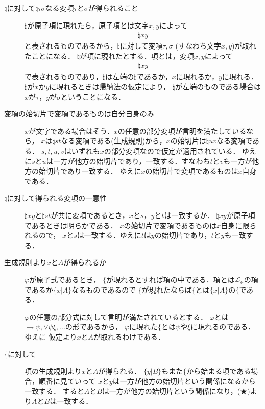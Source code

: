 	\begin{description}
		\item[$\natural$に対して$\natural \tau \sigma$なる変項$\tau$と$\sigma$が得られること]
			$\natural$が原子項に現れたら，原子項とは文字$x,y$によって
			\begin{align}
				\natural xy
			\end{align}
			と表されるものであるから，$\natural$に対して変項$\tau,\sigma$ (すなわち文字$x,y$)が取れたことになる．
			$\natural$が項に現れたとする．項とは，変項$x,y$によって
			\begin{align}
				\natural xy
			\end{align}
			で表されるものであり，$\natural$は左端の$\natural$であるか，$x$に現れるか，$y$に現れる．
			$\natural$が$x$か$y$に現れるときは帰納法の仮定により，
			$\natural$が左端のものである場合は$x$が$\tau$，$y$が$\sigma$ということになる．
			
		\item[変項の始切片で変項であるものは自分自身のみ]
			$x$が文字である場合はそう．$x$の任意の部分変項が言明を満たしているなら，
			$x$は$\natural st$なる変項である(生成規則)から，$x$の始切片は$\natural uv$なる変項である．
			$s,t,u,v$はいずれも$x$の部分変項なので仮定が適用されている．
			ゆえに$s$と$u$は一方が他方の始切片であり，一致する．すなわち$t$と$v$も一方が他方の始切片であり一致する．
			ゆえに$x$の始切片で変項であるものは$x$自身である．
			
		\item[$\natural$に対して得られる変項の一意性]
			$\natural xy$と$\natural st$が共に変項であるとき，$x$と$s$，$y$と$t$は一致するか．
			$\natural xy$が原子項であるときは明らかである．
			$x$の始切片で変項であるものは$x$自身に限られるので，
			$x$と$s$は一致する．ゆえに$t$は$y$の始切片であり，$t$と$y$も一致する．
		
		\item[生成規則より$x$と$A$が得られるか]
			$\varphi$が原子式であるとき，
			$\{$が現れるとすれば項の中である．項とは$\mathcal{L}_{\in}$の項であるか$\{x|A\}$なるものであるので
			$\{$が現れたならば$\{$とは$\{x|A\}$の$\{$である．
			
			$\varphi$の任意の部分式に対して言明が満たされているとする．
			$\varphi$とは$\rightharpoondown \psi,\vee \psi \xi,...$の形であるから，
			$\varphi$に現れた$\{$とは$\psi$や$\xi$に現れるのである．ゆえに
			仮定より$x$と$A$が取れるわけである．
			
		\item[$\{$に対して]
			項の生成規則より$x$と$A$が得られる．
			$\{y|B\}$もまた$\{$から始まる項である場合，順番に見ていって
			$x$と$y$は一方が他方の始切片という関係になるから一致する．
			すると$A$と$B$は一方が他方の始切片という関係になり，(★)より$A$と$B$は一致する．
			

\end{description}
